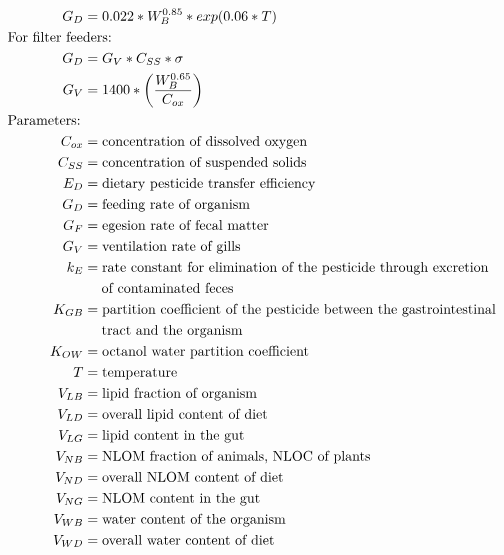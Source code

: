 \documentclass[10pt]{article}
\begin{document}
\begin{align*}
G_{D} & = 0.022*W_{B}^{0.85}*exp(0.06*T) \nonumber \\
&    \hspace{-.75in}  \text{For filter feeders:} \nonumber \\
G_{D} & = G_{V}*C_{SS}*\sigma \nonumber \\
G_{V} & = 1400*\left(\frac{W_{B}^{0.65}}{C_{ox}}\right) \nonumber \\
& \hspace{-.75in} \text{Parameters:} \nonumber \\
C_{ox} & = \text{concentration of dissolved oxygen} \nonumber \\
C_{SS} & = \text{concentration of suspended solids} \nonumber \\
E_{D} & = \text{dietary pesticide transfer efficiency} \nonumber \\
G_{D} & = \text{feeding rate of organism} \nonumber \\
G_{F} & = \text{egesion rate of fecal matter} \nonumber\\
G_{V} & = \text{ventilation rate of gills} \nonumber\\
k_{E} & = \text{rate constant for elimination of the pesticide through excretion} \nonumber \\ &\hspace{1.3em} \text{of contaminated feces} \nonumber\\
K_{GB} & = \text{partition coefficient of the pesticide between the gastrointestinal} \nonumber \\ &\hspace{1.3em} \text{tract and the organism} \nonumber\\
K_{OW} & = \text{octanol water partition coefficient} \nonumber\\
T & = \text{temperature} \nonumber\\
V_{LB} & = \text{lipid fraction of organism} \nonumber\\
V_{LD} & = \text{overall lipid content of diet} \nonumber\\
V_{LG} & = \text{lipid content in the gut} \nonumber\\
V_{NB} & = \text{NLOM fraction of animals, NLOC of plants} \nonumber\\
V_{ND} & = \text{overall NLOM content of diet} \nonumber \\
V_{NG} & = \text{NLOM content in the gut} \nonumber \\
V_{WB} & = \text{water content of the organism} \nonumber \\
V_{WD} & = \text{overall water content of diet} \nonumber \\

\end{align*}
\end{document}

